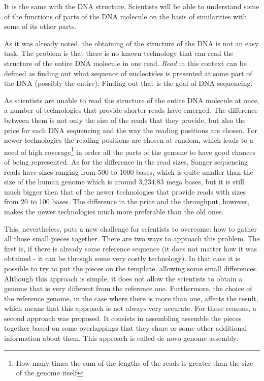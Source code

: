 \documentclass[11pt]{article}
\begin{document}
It is the same with the DNA structure. Scientists will be able to understand
some of the functions of parts of the DNA molecule on the basis of similarities 
with some of its other parts.

As it was already noted, the obtaining of the structure of the DNA is not an
easy task. The problem is that there is no known technology that can read the
structure of the entire DNA molecule in one read. \emph{Read} in this context can be defined as 
finding out what sequence of nucleotides is presented at some part of the DNA (possibly the entire). 
Finding out that is the goal of DNA sequencing.

As scientists are unable to read the structure of the entire DNA molecule at once, a number of
technologies that provide shorter reads have emerged. The difference between
them is not only the size of the reads that they provide, but also the price for
each DNA sequencing and the way the reading positions are chosen. For newer technologies
the reading positions are chosen at random, which leads to a need of high coverage\footnote{
How many times the sum of the lengths of the reads is greater than the size of the 
genome itself} in order all the parts of the genome to have good chances of being represented.
As for the difference in the read sizes, Sanger sequencing reads have sizes ranging from
500 to 1000 bases, which is quite smaller than the size of the human genome which
is around 3,234.83 mega bases, but it is still much bigger then that of the
newer technologies that provide reads with sizes from 20 to 100 bases. The
difference in the price and the throughput, however, makes the newer technologies
much more preferable than the old ones.

This, nevertheless, puts a new challenge for scientists to overcome: how to gather
all those small pieces together. There are two ways to approach this problem.
The first is, if there is already some reference sequence (it does not matter
how it was obtained - it can be through some very costly technology). In that
case it is possible to try to put the pieces on the template, allowing some
small differences. Although this approach is simple, it does not allow the scientists to
obtain a genome that is very different from the reference one. Furthermore, the
choice of the reference genome, in the case where there is more than one,
affects the result, which means that this approach is not always very accurate.
For those reasons, a second approach was proposed. It consists in assembling
assemble the pieces together based on some overlappings that they share or some
other additional information about them. This approach is called de novo genome
assembly.
\end{document}
